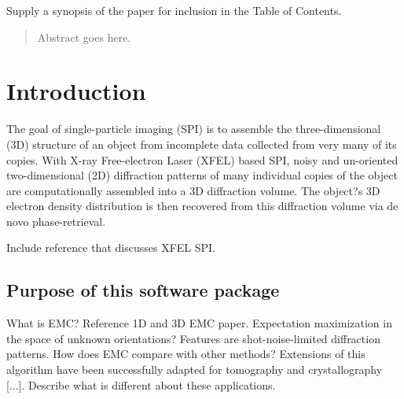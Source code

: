 \documentclass[]{iucr}              %
\begin{document}

\maketitle                        %

\begin{synopsis}
Supply a synopsis of the paper for inclusion in the Table of Contents.
\end{synopsis}

\begin{abstract}
Abstract goes here.
\end{abstract}



\section{Introduction}
The goal of single-particle imaging (SPI) is to assemble the three-dimensional (3D) structure of an object from incomplete data collected from very many of its copies. With X-ray Free-electron Laser (XFEL) based SPI, noisy and un-oriented two-dimensional (2D) diffraction patterns of many individual copies of the object are computationally assembled into a 3D diffraction volume. The object?s 3D electron density distribution is then recovered from this diffraction volume via de novo phase-retrieval. 

Include reference that discusses XFEL SPI.

\subsection{Purpose of this software package}
What is EMC? Reference 1D and 3D EMC paper. Expectation maximization in the space of unknown orientations?
Features are shot-noise-limited diffraction patterns.
How does EMC compare with other methods?
Extensions of this algorithm have been successfully adapted for tomography and crystallography [...]. Describe what is different about these applications. 
\end{document}
